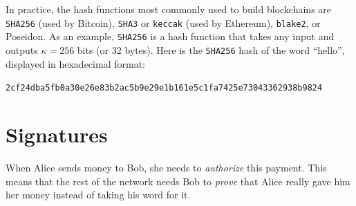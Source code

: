 In practice, the hash functions most commonly used to build blockchains are
\texttt{SHA256} (used by Bitcoin), \texttt{SHA3} or \texttt{keccak} (used by Ethereum),
\texttt{blake2}, or Poseidon. As an example, \texttt{SHA256} is a hash function that takes
any input and outputs $\kappa = 256$ bits (or $32$ bytes). Here is the \texttt{SHA256} hash
of the word ``hello'', displayed in hexadecimal format:

\texttt{2cf24dba5fb0a30e26e83b2ac5b9e29e1b161e5c1fa7425e73043362938b9824}

%
%
%
\section{Signatures}

When Alice sends money to Bob, she needs to \emph{authorize} this payment. This means
that the rest of the network needs Bob to \emph{prove} that Alice really gave him
her money instead of taking his word for it.

